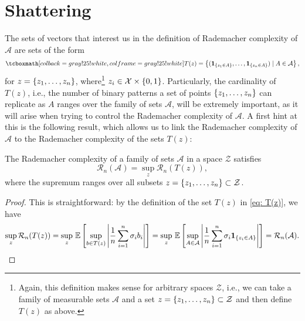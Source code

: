 \section{Shattering}
\label{sec: shattering}

The sets of vectors that interest us in the definition of Rademacher complexity of
$\mathcal{A}$ are sets of the form
\begin{equation}
\label{eq: T(z)}
    \highlightMath{
        T(z) = \set{(\indSet{z_1 \in A}, \dots, \indSet{z_n \in A}) \with A \in \mathcal{A}},
    }
\end{equation}
for $z = \left\{z_1, \dots, z_n\right\}$, where\footnote{Again, this definition makes sense for arbitrary spaces $\mathcal{Z}$, i.e., we can take a family of measurable sets $\mathcal{A}$ and a set $z = \left\{z_1, \dots, z_n\right\} \subset \mathcal{Z}$ and then define $T(z)$ as above.} $z_i \in \mathcal{X} \times \left\{0, 1\right\}$. Particularly, the cardinality of $T(z)$, i.e., the number of binary patterns a set of points $\left\{z_1, \dots, z_n\right\}$ can replicate as $A$ ranges over the family of sets $\mathcal{A}$, will be extremely important, as it will arise when trying to control the Rademacher complexity of $\mathcal{A}$. A first hint at this is the following result, which allows us to link the Rademacher complexity of $\mathcal{A}$ to the Rademacher complexity of the sets $T(z)$:

\begin{lemma}
\label{lem: rademacher complexity of family of sets}
The Rademacher complexity of a family of sets $\mathcal{A}$ in a space $\mathcal{Z}$ satisfies
\[
    \mathcal{R}_n(\mathcal{A}) = \sup_z \mathcal{R}_n(T(z)),
\]
where the supremum ranges over all subsets $z = \left\{z_1, \dots, z_n\right\} \subset \mathcal{Z}$.
\end{lemma}

\begin{proof}
This is straightforward: by the definition of the set $T(z)$ in \eqref{eq: T(z)}, we have
\[
    \sup_z \mathcal{R}_n(T(z)) = \sup_z \, \mathbb{E}\left[ \sup_{b \in T(z)} \abs{\frac{1}{n} \sum_{i=1}^n \sigma_i b_i}\right] = \sup_z \, \mathbb{E}\left[ \sup_{A \in \mathcal{A}} \abs{\frac{1}{n} \sum_{i=1}^n \sigma_i \mathbf{1}_{\left\{z_i \in A\right\}}}\right] = \mathcal{R}_n(\mathcal{A}).
\]
\end{proof}

